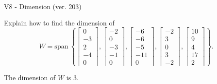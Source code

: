 \begin{exercise}
  \begin{exerciseTitle}V8 - Dimension (ver. 203)\end{exerciseTitle}
  \begin{exerciseStatement}
    Explain how to find the dimension of 
\[W=\mathrm{span}\ \left\{\left[\begin{array}{r}
0 \\
-3 \\
2 \\
-4 \\
0
\end{array}\right] , \left[\begin{array}{r}
-2 \\
0 \\
-3 \\
-1 \\
0
\end{array}\right] , \left[\begin{array}{r}
-6 \\
-6 \\
-5 \\
-11 \\
0
\end{array}\right] , \left[\begin{array}{r}
-2 \\
3 \\
0 \\
3 \\
-2
\end{array}\right] , \left[\begin{array}{r}
10 \\
9 \\
4 \\
17 \\
2
\end{array}\right]\right\}.\]



  \end{exerciseStatement}
  \begin{exerciseAnswer}
   The dimension of \(W\) is  \(3\).
  


  \end{exerciseAnswer}
\end{exercise}